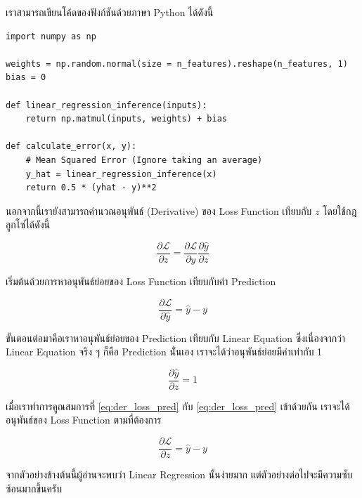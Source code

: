 เราสามารถเขียนโค้ดของฟังก์ชันด้วยภาษา Python ได้ดังนี้

\begin{lstlisting}[style=MyPython]
import numpy as np

weights = np.random.normal(size = n_features).reshape(n_features, 1)
bias = 0

def linear_regression_inference(inputs):
    return np.matmul(inputs, weights) + bias   

def calculate_error(x, y):
    # Mean Squared Error (Ignore taking an average)
    y_hat = linear_regression_inference(x)
    return 0.5 * (yhat - y)**2 
\end{lstlisting}

นอกจากนี้เรายังสามารถคำนวณอนุพันธ์ (Derivative) ของ Loss Function เทียบกับ $z$ โดยใช้กฎลูกโซ่ได้ดังนี้

\begin{equation}\label{eq:loss_chain_rule}
    \frac{\partial \mathcal{L}}{\partial z} = 
    \frac{\partial \mathcal{L}}{\partial \hat{y}} \frac{\partial \hat{y}}{\partial z}
\end{equation}

\noindent เริ่มต้นด้วยการหาอนุพันธ์ย่อยของ Loss Function เทียบกับค่า Prediction

\begin{equation}\label{eq:der_loss_pred}
    \frac{\partial \mathcal{L}}{\partial \hat{y}} = \hat{y} - y
\end{equation}

\noindent ขั้นตอนต่อมาคือเราหาอนุพันธ์ย่อยของ Prediction เทียบกับ Linear Equation ซึ่งเนื่องจากว่า Linear Equation จริง ๆ 
ก็คือ Prediction นั่่นเอง เราจะได้ว่าอนุพันธ์ย่อยมีค่าเท่ากับ 1

\begin{equation}\label{eq:der_pred_lin_eq}
    \frac{\partial \hat{y}}{\partial z} = 1
\end{equation}

\noindent เมื่อเราทำการคูณสมการที่ \ref{eq:der_loss_pred} กับ \ref{eq:der_loss_pred} เข้าด้วยกัน เราจะได้อนุพันธ์ของ Loss 
Function ตามที่ต้องการ 

\begin{equation}\label{eq:der_loss_lin_eq}
    \frac{\partial \mathcal{L}}{\partial z} = \hat{y} - y
\end{equation}

\noindent จากตัวอย่างข้างต้นนี้ผู้อ่านจะพบว่า Linear Regression นั้นง่ายมาก แต่ตัวอย่างต่อไปจะมีความซับซ้อนมากขึ้นครับ

